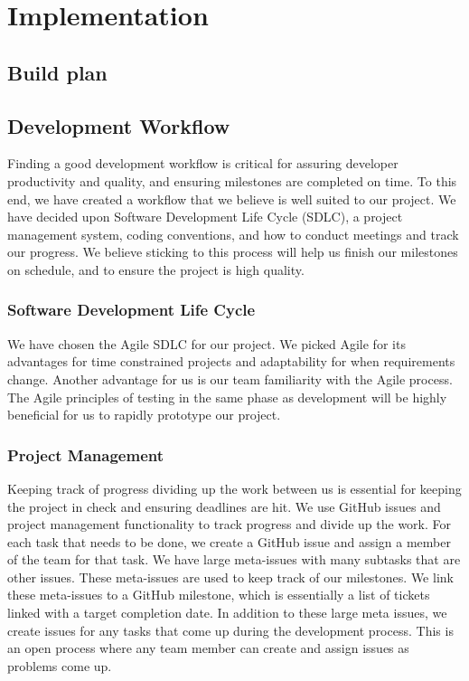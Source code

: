 \section{Implementation}

\subsection{Build plan}

\subsection{Development Workflow}

Finding a good development workflow is critical for assuring developer productivity and
quality, and ensuring milestones are completed on time. To this end, we have created a
workflow that we believe is well suited to our project. We have decided upon Software
Development Life Cycle (SDLC), a project management system, coding conventions, and how to
conduct meetings and track our progress. We believe sticking to this process will help us
finish our milestones on schedule, and to ensure the project is high quality.

\subsubsection{Software Development Life Cycle}

We have chosen the Agile SDLC for our project. We picked Agile for its advantages for time
constrained projects and adaptability for when requirements change. Another advantage for us
is our team familiarity with the Agile process. The Agile principles of testing in the
same phase as development will be highly beneficial for us to rapidly prototype our
project.

\subsubsection{Project Management}

Keeping track of progress dividing up the work between us is essential for keeping the
project in check and ensuring deadlines are hit. We use GitHub issues and project
management functionality to track progress and divide up the work. For each task that
needs to be done, we create a GitHub issue and assign a member of the team for that task.
We have large meta-issues with many subtasks that are other issues. These meta-issues are
used to keep track of our milestones. We link these meta-issues to a GitHub milestone,
which is essentially a list of tickets linked with a target completion date. In addition
to these large meta issues, we create issues for any tasks that come up during the
development process. This is an open process where any team member can create and assign
issues as problems come up.

